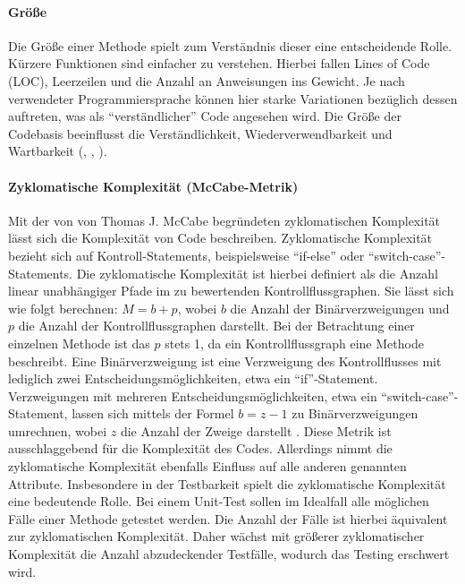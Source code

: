 \documentclass[a4paper, 12pt]{article}
\begin{document}
\paragraph{Größe}
Die Größe einer Methode spielt zum Verständnis dieser eine entscheidende Rolle. Kürzere Funktionen sind einfacher zu verstehen. 
Hierbei fallen Lines of Code (LOC), Leerzeilen und die Anzahl an Anweisungen ins Gewicht. 
Je nach verwendeter Programmiersprache können hier starke Variationen bezüglich dessen auftreten, was als \enquote{verständlicher} Code angesehen wird. Die Größe der Codebasis beeinflusst die Verständlichkeit, Wiederverwendbarkeit und Wartbarkeit (\textcite{Kim_software_implementation}, \textcite{Lorenz_object_oriented_software_metrics}, \textcite{Linda_softwarequality}).

\paragraph{Zyklomatische Komplexität (McCabe-Metrik)}
Mit der von von Thomas J. McCabe begründeten zyklomatischen Komplexität lässt sich die Komplexität von Code beschreiben. 
Zyklomatische Komplexität bezieht sich auf Kontroll-Statements, beispielsweise \enquote{if-else} oder \enquote{switch-case}-Statements.
Die zyklomatische Komplexität ist hierbei definiert als die Anzahl linear unabhängiger Pfade im zu bewertenden Kontrollflussgraphen.
Sie lässt sich wie folgt berechnen: $M = b + p$, wobei $b$ die Anzahl der Binärverzweigungen und $p$ die Anzahl der Kontrollflussgraphen darstellt.
Bei der Betrachtung einer einzelnen Methode ist das $p$ stets 1, da ein Kontrollflussgraph eine Methode beschreibt.
Eine Binärverzweigung ist eine Verzweigung des Kontrollflusses mit lediglich zwei Entscheidungsmöglichkeiten, etwa ein \enquote{if}-Statement.
Verzweigungen mit mehreren Entscheidungsmöglichkeiten, etwa ein \enquote{switch-case}-Statement, lassen sich mittels der Formel $b = z - 1$ zu Binärverzweigungen umrechnen,  wobei $z$ die Anzahl der Zweige darstellt \parencite{McCabe_complexity}.
Diese Metrik ist ausschlaggebend für die Komplexität des Codes.
Allerdings nimmt die zyklomatische Komplexität ebenfalls Einfluss auf alle anderen genannten Attribute.
Insbesondere in der Testbarkeit spielt die zyklomatische Komplexität eine bedeutende Rolle.
Bei einem Unit-Test sollen im Idealfall alle möglichen Fälle einer Methode getestet werden.
Die Anzahl der Fälle ist hierbei äquivalent zur zyklomatischen Komplexität.
Daher wächst mit größerer zyklomatischer Komplexität die Anzahl abzudeckender Testfälle, wodurch das Testing erschwert wird.
\end{document}
